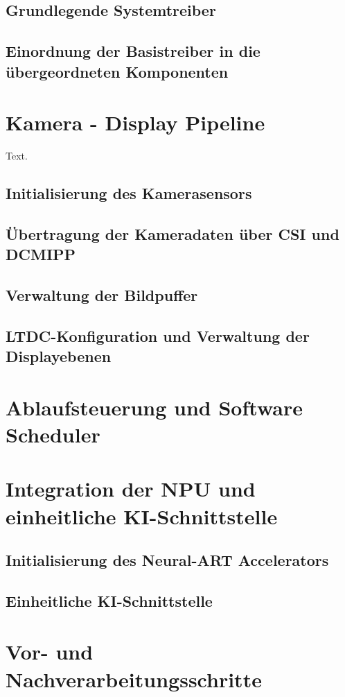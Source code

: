 \subsection{Grundlegende Systemtreiber}
\subsection{Einordnung der Basistreiber in die übergeordneten Komponenten}

\section{Kamera - Display Pipeline}
Text.

\subsection{Initialisierung des Kamerasensors}
\subsection{Übertragung der Kameradaten über CSI und DCMIPP}
\subsection{Verwaltung der Bildpuffer}
\subsection{LTDC-Konfiguration und Verwaltung der Displayebenen}

\section{Ablaufsteuerung und Software Scheduler}

\section{Integration der NPU und einheitliche KI-Schnittstelle}
\subsection{Initialisierung des Neural-ART Accelerators}
\subsection{Einheitliche KI-Schnittstelle}

\section{Vor- und Nachverarbeitungsschritte}
